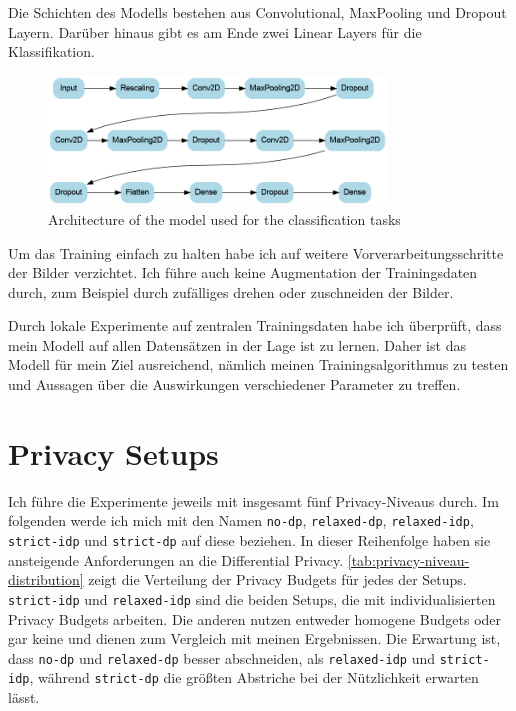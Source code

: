 Die Schichten des Modells bestehen aus Convolutional, MaxPooling und Dropout Layern. Darüber hinaus gibt es am Ende zwei Linear Layers für die Klassifikation.

\begin{figure}[tb]
	\centering
	\includegraphics[width=0.8\textwidth]{Bilder/model_architecture_1.png}
	\caption{Architecture of the model used for the classification tasks}
	\label{fig:model-architecture}
\end{figure}

Um das Training einfach zu halten habe ich auf weitere Vorverarbeitungsschritte der Bilder verzichtet. Ich führe auch keine Augmentation der Trainingsdaten durch, zum Beispiel durch zufälliges drehen oder zuschneiden der Bilder.

Durch lokale Experimente auf zentralen Trainingsdaten habe ich überprüft, dass mein Modell auf allen Datensätzen in der Lage ist zu lernen. Daher ist das Modell für mein Ziel ausreichend, nämlich meinen Trainingsalgorithmus zu testen und Aussagen über die Auswirkungen verschiedener Parameter zu treffen.

\section{Privacy Setups}
Ich führe die Experimente jeweils mit insgesamt fünf Privacy-Niveaus durch. Im folgenden werde ich mich mit den Namen \texttt{no-dp}, \texttt{relaxed-dp}, \texttt{relaxed-idp}, \texttt{strict-idp} und \texttt{strict-dp} auf diese beziehen. In dieser Reihenfolge haben sie ansteigende Anforderungen an die Differential Privacy. \autoref{tab:privacy-niveau-distribution} zeigt die Verteilung der Privacy Budgets für jedes der Setups. \texttt{strict-idp} und \texttt{relaxed-idp} sind die beiden Setups, die mit individualisierten Privacy Budgets arbeiten. Die anderen nutzen entweder homogene Budgets oder gar keine und dienen zum Vergleich mit meinen Ergebnissen. Die Erwartung ist, dass \texttt{no-dp} und \texttt{relaxed-dp} besser abschneiden, als \texttt{relaxed-idp} und \texttt{strict-idp}, während \texttt{strict-dp} die größten Abstriche bei der Nützlichkeit erwarten lässt.

